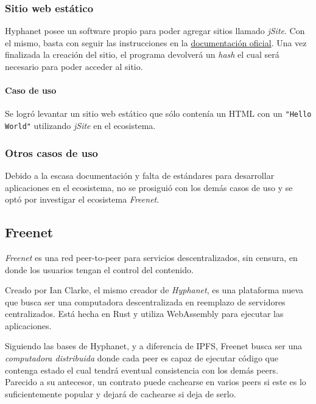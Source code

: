 \subsubsection{Sitio web estático}

Hyphanet posee un software propio para poder agregar sitios llamado \textit{jSite}\cite{hyphanet-jsite}. Con el mismo, basta con seguir las instrucciones en la \href{https://www.hyphanet.org/pages/documentation.html}{documentación oficial}. Una vez finalizada la creación del sitio, el programa devolverá un \textit{hash} el cual será necesario para poder acceder al sitio.


\paragraph{Caso de uso}

Se logró levantar un sitio web estático que sólo contenía un HTML con un \texttt{"Hello World"} utilizando \textit{jSite}\cite{hyphanet-jsite} en el ecosistema.

\subsubsection{Otros casos de uso}

Debido a la escasa documentación y falta de estándares para desarrollar aplicaciones en el ecosistema, no se prosiguió con los demás casos de uso y se optó por investigar el ecosistema \textit{Freenet}.


\subsection{Freenet}

\textit{Freenet}\cite{freenet} es una red peer-to-peer para servicios descentralizados, sin censura, en donde los usuarios tengan el control del contenido.

Creado por Ian Clarke, el mismo creador de \textit{Hyphanet}\cite{hyphanet}, es una plataforma nueva que busca ser una computadora descentralizada en reemplazo de servidores centralizados. Está hecha en Rust y utiliza WebAssembly para ejecutar las aplicaciones.

Siguiendo las bases de Hyphanet, y a diferencia de IPFS, Freenet busca ser una \textit{computadora distribuida} donde cada peer es capaz de ejecutar código que contenga estado el cual tendrá eventual consistencia con los demás peers. Parecido a su antecesor, un contrato puede cachearse en varios peers si este es lo suficientemente popular y dejará de cachearse si deja de serlo.

